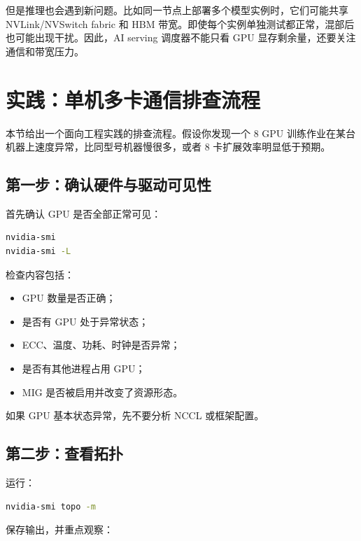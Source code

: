 但是推理也会遇到新问题。比如同一节点上部署多个模型实例时，它们可能共享 NVLink/NVSwitch fabric 和 HBM 带宽。即使每个实例单独测试都正常，混部后也可能出现干扰。因此，AI serving 调度器不能只看 GPU 显存剩余量，还要关注通信和带宽压力。

\section{实践：单机多卡通信排查流程}
\label{sec:single-node-comm-debug-workflow}

本节给出一个面向工程实践的排查流程。假设你发现一个 8 GPU 训练作业在某台机器上速度异常，比同型号机器慢很多，或者 8 卡扩展效率明显低于预期。

\subsection{第一步：确认硬件与驱动可见性}
\label{subsec:debug-step-hardware}

首先确认 GPU 是否全部正常可见：

\begin{lstlisting}[language=bash,caption={确认 GPU 可见性},label={lst:debug-gpu-visible}]
nvidia-smi
nvidia-smi -L
\end{lstlisting}

检查内容包括：

\begin{itemize}
  \item GPU 数量是否正确；
  \item 是否有 GPU 处于异常状态；
  \item ECC、温度、功耗、时钟是否异常；
  \item 是否有其他进程占用 GPU；
  \item MIG 是否被启用并改变了资源形态。
\end{itemize}

如果 GPU 基本状态异常，先不要分析 NCCL 或框架配置。

\subsection{第二步：查看拓扑}
\label{subsec:debug-step-topology}

运行：

\begin{lstlisting}[language=bash,caption={查看拓扑},label={lst:debug-topology}]
nvidia-smi topo -m
\end{lstlisting}

保存输出，并重点观察：

